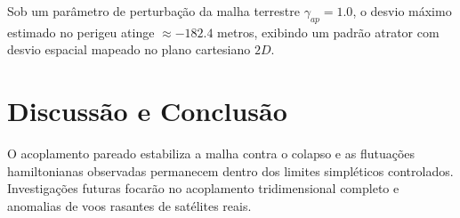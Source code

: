 \documentclass[11pt,twocolumn]{article}
\begin{document}
Sob um parâmetro de perturbação da malha terrestre $\gamma_{ap} = 1.0$, o desvio máximo estimado no perigeu atinge $\approx -182.4$ metros, exibindo um padrão atrator com desvio espacial mapeado no plano cartesiano $2D$.

\section{Discussão e Conclusão}
O acoplamento pareado estabiliza a malha contra o colapso e as flutuações hamiltonianas observadas permanecem dentro dos limites simpléticos controlados. Investigações futuras focarão no acoplamento tridimensional completo e anomalias de voos rasantes de satélites reais.
\end{document}
